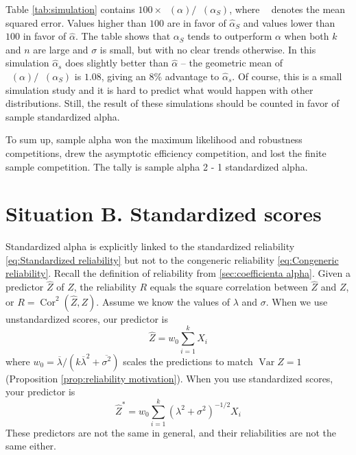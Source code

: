 \documentclass[twoside]{article}
\DeclareMathOperator{\Var}{Var}
\DeclareMathOperator{\Cor}{Cor}
\DeclareMathOperator{\MSE}{MSE_Z}
\begin{document}
Table \ref{tab:simulation} contains $100 \times \MSE(\alpha)/\MSE(\alpha_S)$, where $\MSE$ denotes the mean squared error. Values higher than $100$ are in favor of $\hat{\alpha}_S$ and values lower than $100$ in favor of $\hat{\alpha}$. The table shows that $\alpha_S$ tends to outperform $\alpha$ when both $k$ and $n$ are large and $\sigma$ is small, but with no clear trends otherwise. In this simulation $\hat{\alpha}_s$ does slightly better than $\hat{\alpha}$ -- the geometric mean of $\MSE(\alpha)/\MSE({\alpha_S})$ is $1.08$, giving an $8$\% advantage to $\hat{\alpha}_s$. Of course, this is a small simulation study and it is hard to predict what would happen with other distributions. Still, the result of these simulations should be counted in favor of sample standardized alpha.

To sum up, sample alpha won the maximum likelihood and robustness competitions, drew the asymptotic efficiency competition, and lost the finite sample competition. The tally is sample alpha 2 - 1 standardized alpha. 



\section{Situation B. Standardized scores}
\label{sec:argument B}

Standardized alpha is explicitly linked to the standardized reliability \eqref{eq:Standardized reliability} but not to the congeneric reliability \eqref{eq:Congeneric reliability}. Recall the definition of reliability from
\cref{sec:coefficienta alpha}. Given a predictor $\hat{Z}$ of $Z$, the
reliability $ R$ equals the square correlation between $\hat{Z}$
and $Z$, or $ R=\Cor^{2}(\hat{Z},Z)$. Assume
we know the values of $\lambda$ and $\sigma$. When we use unstandardized
scores, our predictor is 
\begin{equation}
\hat{Z}=w_{0}\sum_{i=1}^{k}X_{i}\label{eq:sum score}
\end{equation}
where $w_{0}=\overline{\lambda}/(k\overline{\lambda}^{2}+\overline{\sigma^{2}})$ scales the predictions to match $\Var Z=1$ (Proposition \ref{prop:reliability motivation}). When you use standardized
scores, your predictor is
\begin{equation}
\hat{Z}^{*}=w_{0}\sum_{i=1}^{k}(\lambda^{2}+\sigma^{2})^{-1/2}X_{i}\label{eq:standardized sum score}
\end{equation}
These predictors are not the same in general, and their reliabilities are not
the same either.
\end{document}

